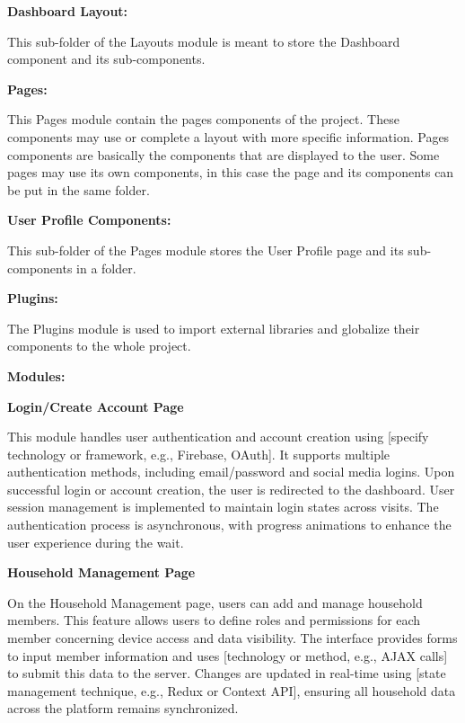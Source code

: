 \documentclass[conference]{IEEEtran}
\begin{document}
\vspace{0.5cm}

\textbf{Dashboard Layout:}

This sub-folder of the Layouts module is meant to store the Dashboard component and its sub-components.

\vspace{0.5cm}

\textbf{Pages:}

This Pages module contain the pages components of the project. These components may use or complete a layout with more specific information. Pages components are basically the components that are displayed to the user. Some pages may use its own components, in this case the page and its components can be put in the same folder.

\vspace{1cm}

\textbf{User Profile Components:}

This sub-folder of the Pages module stores the User Profile page and its sub-components in a folder.

\vspace{0.5cm}

\textbf{Plugins:}  

The Plugins module is used to import external libraries and globalize their components to the whole project.



\textbf{Modules:}  

\textbf{Login/Create Account Page}

This module handles user authentication and account creation using [specify technology or framework, e.g., Firebase, OAuth]. It supports multiple authentication methods, including email/password and social media logins. Upon successful login or account creation, the user is redirected to the dashboard. User session management is implemented to maintain login states across visits. The authentication process is asynchronous, with progress animations to enhance the user experience during the wait.
\vspace{0.5cm}

\textbf{Household Management Page}

On the Household Management page, users can add and manage household members. This feature allows users to define roles and permissions for each member concerning device access and data visibility. The interface provides forms to input member information and uses [technology or method, e.g., AJAX calls] to submit this data to the server. Changes are updated in real-time using [state management technique, e.g., Redux or Context API], ensuring all household data across the platform remains synchronized.
\vspace{0.5cm}
\end{document}
